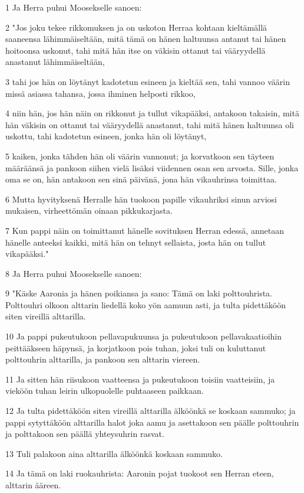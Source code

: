 \par 1 Ja Herra puhui Moosekselle sanoen:
\par 2 "Jos joku tekee rikkomuksen ja on uskoton Herraa kohtaan kieltämällä saaneensa lähimmäiseltään, mitä tämä on hänen haltuunsa antanut tai hänen hoitoonsa uskonut, tahi mitä hän itse on väkisin ottanut tai vääryydellä anastanut lähimmäiseltään,
\par 3 tahi jos hän on löytänyt kadotetun esineen ja kieltää sen, tahi vannoo väärin missä asiassa tahansa, jossa ihminen helposti rikkoo,
\par 4 niin hän, jos hän näin on rikkonut ja tullut vikapääksi, antakoon takaisin, mitä hän väkisin on ottanut tai vääryydellä anastanut, tahi mitä hänen haltuunsa oli uskottu, tahi kadotetun esineen, jonka hän oli löytänyt,
\par 5 kaiken, jonka tähden hän oli väärin vannonut; ja korvatkoon sen täyteen määräänsä ja pankoon siihen vielä lisäksi viidennen osan sen arvosta. Sille, jonka oma se on, hän antakoon sen sinä päivänä, jona hän vikauhrinsa toimittaa.
\par 6 Mutta hyvityksenä Herralle hän tuokoon papille vikauhriksi sinun arviosi mukaisen, virheettömän oinaan pikkukarjasta.
\par 7 Kun pappi näin on toimittanut hänelle sovituksen Herran edessä, annetaan hänelle anteeksi kaikki, mitä hän on tehnyt sellaista, josta hän on tullut vikapääksi."
\par 8 Ja Herra puhui Moosekselle sanoen:
\par 9 "Käske Aaronia ja hänen poikiansa ja sano: Tämä on laki polttouhrista. Polttouhri olkoon alttarin liedellä koko yön aamuun asti, ja tulta pidettäköön siten vireillä alttarilla.
\par 10 Ja pappi pukeutukoon pellavapukuunsa ja pukeutukoon pellavakaatioihin peittääkseen häpynsä, ja korjatkoon pois tuhan, joksi tuli on kuluttanut polttouhrin alttarilla, ja pankoon sen alttarin viereen.
\par 11 Ja sitten hän riisukoon vaatteensa ja pukeutukoon toisiin vaatteisiin, ja vieköön tuhan leirin ulkopuolelle puhtaaseen paikkaan.
\par 12 Ja tulta pidettäköön siten vireillä alttarilla älköönkä se koskaan sammuko; ja pappi sytyttäköön alttarilla halot joka aamu ja asettakoon sen päälle polttouhrin ja polttakoon sen päällä yhteysuhrin rasvat.
\par 13 Tuli palakoon aina alttarilla älköönkä koskaan sammuko.
\par 14 Ja tämä on laki ruokauhrista: Aaronin pojat tuokoot sen Herran eteen, alttarin ääreen.

